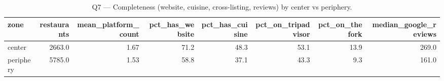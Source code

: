 \begin{table}[ht]
\centering
\caption{Q7 — Completeness (website, cuisine, cross-listing, reviews) by center vs periphery.}
\label{tab:q7_completeness_center_periphery}
{\tiny
\begin{tabular}{lrrrrrrr}
\toprule
zone & restaurants & mean\_platform\_count & pct\_has\_website & pct\_has\_cuisine & pct\_on\_tripadvisor & pct\_on\_thefork & median\_google\_reviews \\
\midrule
center & 2663.0 & 1.67 & 71.2 & 48.3 & 53.1 & 13.9 & 269.0 \\
periphery & 5785.0 & 1.53 & 58.8 & 37.1 & 43.3 & 9.3 & 161.0 \\
\bottomrule
\end{tabular}
}
\end{table}

